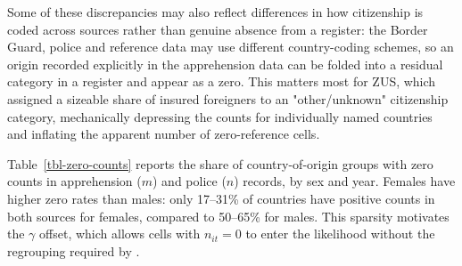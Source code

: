  Some of these discrepancies may also reflect differences in how citizenship is coded across sources rather than genuine absence from a register: the Border Guard, police and reference data may use different country-coding schemes, so an origin recorded explicitly in the apprehension data can be folded into a residual category in a register and appear as a zero. This matters most for ZUS, which assigned a sizeable share of insured foreigners to an "other/unknown" citizenship category, mechanically depressing the counts for individually named countries and inflating the apparent number of zero-reference cells.



Table~\ref{tbl-zero-counts} reports the share of country-of-origin
groups with zero counts in apprehension ($m$) and police ($n$)
records, by sex and year. Females have higher zero rates than males:
only 17--31\% of countries have positive counts in both sources for
females, compared to 50--65\% for males. This sparsity motivates the
$\gamma$ offset, which allows cells with $n_{it} = 0$ to enter the
likelihood without the regrouping required by \citet{Zhang2008}.


